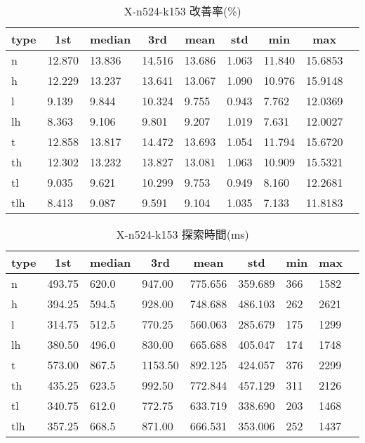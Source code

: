 \begin{table}[htbp]
    \caption{X-n524-k153 改善率(\%)}
    \begin{tabular}{|l|l|l|l|l|l|l|l|l|}\hline
    \multicolumn{1}{|c|}{\textbf{type}}
    &\multicolumn{1}{|c|}{\textbf{1st}}
    &\multicolumn{1}{c|}{\textbf{median}}
    &\multicolumn{1}{c|}{\textbf{3rd}}
    &\multicolumn{1}{c|}{\textbf{mean}}
    &\multicolumn{1}{c|}{\textbf{std}}
    &\multicolumn{1}{c|}{\textbf{min}}
    &\multicolumn{1}{c|}{\textbf{max}}\\\hline
	n & 12.870 & 13.836 & 14.516 & 13.686 & 1.063 & 11.840 & 15.6853\\\hline
	h & 12.229 & 13.237 & 13.641 & 13.067 & 1.090 & 10.976 & 15.9148\\\hline
	l & 9.139 & 9.844 & 10.324 & 9.755 & 0.943 & 7.762 & 12.0369\\\hline
	lh & 8.363 & 9.106 & 9.801 & 9.207 & 1.019 & 7.631 & 12.0027\\\hline
	t & 12.858 & 13.817 & 14.472 & 13.693 & 1.054 & 11.794 & 15.6720\\\hline
	th & 12.302 & 13.232 & 13.827 & 13.081 & 1.063 & 10.909 & 15.5321\\\hline
	tl & 9.035 & 9.621 & 10.299 & 9.753 & 0.949 & 8.160 & 12.2681\\\hline
	tlh & 8.413 & 9.087 & 9.591 & 9.104 & 1.035 & 7.133 & 11.8183\\\hline
	\end{tabular}
\end{table}
\begin{table}[htbp]
    \caption{X-n524-k153 探索時間(ms)}
    \begin{tabular}{|l|l|l|l|l|l|l|l|l|}\hline
    \multicolumn{1}{|c|}{\textbf{type}}
    &\multicolumn{1}{|c|}{\textbf{1st}}
    &\multicolumn{1}{c|}{\textbf{median}}
    &\multicolumn{1}{c|}{\textbf{3rd}}
    &\multicolumn{1}{c|}{\textbf{mean}}
    &\multicolumn{1}{c|}{\textbf{std}}
    &\multicolumn{1}{c|}{\textbf{min}}
    &\multicolumn{1}{c|}{\textbf{max}}\\\hline
	n & 493.75 & 620.0 & 947.00 & 775.656 & 359.689 & 366 & 1582\\\hline
	h & 394.25 & 594.5 & 928.00 & 748.688 & 486.103 & 262 & 2621\\\hline
	l & 314.75 & 512.5 & 770.25 & 560.063 & 285.679 & 175 & 1299\\\hline
	lh & 380.50 & 496.0 & 830.00 & 665.688 & 405.047 & 174 & 1748\\\hline
	t & 573.00 & 867.5 & 1153.50 & 892.125 & 424.057 & 376 & 2299\\\hline
	th & 435.25 & 623.5 & 992.50 & 772.844 & 457.129 & 311 & 2126\\\hline
	tl & 340.75 & 612.0 & 772.75 & 633.719 & 338.690 & 203 & 1468\\\hline
	tlh & 357.25 & 668.5 & 871.00 & 666.531 & 353.006 & 252 & 1437\\\hline
	\end{tabular}
\end{table}
